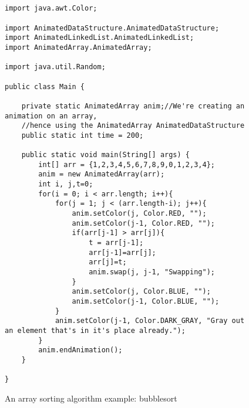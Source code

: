 \begin{figure}
\begin{center}
\begin{verbatim}


import java.awt.Color;

import AnimatedDataStructure.AnimatedDataStructure;
import AnimatedLinkedList.AnimatedLinkedList;
import AnimatedArray.AnimatedArray;

import java.util.Random;

public class Main {
    
    private static AnimatedArray anim;//We're creating an animation on an array,
    //hence using the AnimatedArray AnimatedDataStructure
    public static int time = 200;

    public static void main(String[] args) {
        int[] arr = {1,2,3,4,5,6,7,8,9,0,1,2,3,4};
        anim = new AnimatedArray(arr);
        int i, j,t=0;
        for(i = 0; i < arr.length; i++){
            for(j = 1; j < (arr.length-i); j++){
                anim.setColor(j, Color.RED, "");
                anim.setColor(j-1, Color.RED, "");
                if(arr[j-1] > arr[j]){
                    t = arr[j-1];
                    arr[j-1]=arr[j];
                    arr[j]=t;
                    anim.swap(j, j-1, "Swapping");
                }
                anim.setColor(j, Color.BLUE, "");
                anim.setColor(j-1, Color.BLUE, "");
            }
            anim.setColor(j-1, Color.DARK_GRAY, "Gray out an element that's in it's place already.");
        }
        anim.endAnimation();
    }
	
}

\end{verbatim}
\end{center}
\caption{An array sorting algorithm example: bubblesort}
\label{fig:animationAlgorithm}
\end{figure}

